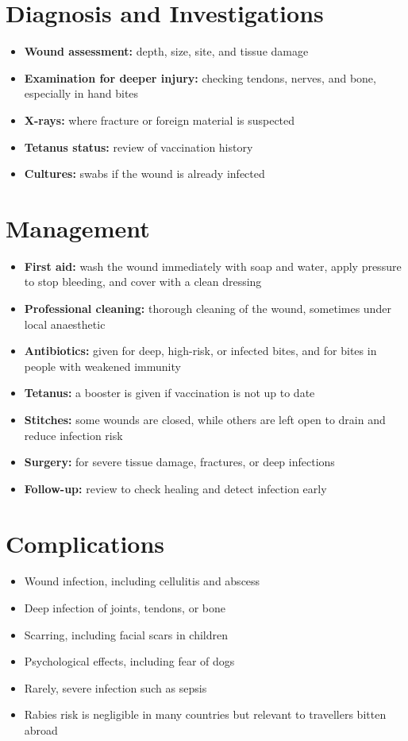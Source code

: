 \section*{Diagnosis and Investigations}
\begin{itemize}
    \item \textbf{Wound assessment:} depth, size, site, and tissue damage
    \item \textbf{Examination for deeper injury:} checking tendons, nerves, and bone, especially in hand bites
    \item \textbf{X-rays:} where fracture or foreign material is suspected
    \item \textbf{Tetanus status:} review of vaccination history
    \item \textbf{Cultures:} swabs if the wound is already infected
\end{itemize}

\section*{Management}
\begin{itemize}
    \item \textbf{First aid:} wash the wound immediately with soap and water, apply pressure to stop bleeding, and cover with a clean dressing
    \item \textbf{Professional cleaning:} thorough cleaning of the wound, sometimes under local anaesthetic
    \item \textbf{Antibiotics:} given for deep, high-risk, or infected bites, and for bites in people with weakened immunity
    \item \textbf{Tetanus:} a booster is given if vaccination is not up to date
    \item \textbf{Stitches:} some wounds are closed, while others are left open to drain and reduce infection risk
    \item \textbf{Surgery:} for severe tissue damage, fractures, or deep infections
    \item \textbf{Follow-up:} review to check healing and detect infection early
\end{itemize}

\section*{Complications}
\begin{itemize}
    \item Wound infection, including cellulitis and abscess
    \item Deep infection of joints, tendons, or bone
    \item Scarring, including facial scars in children
    \item Psychological effects, including fear of dogs
    \item Rarely, severe infection such as sepsis
    \item Rabies risk is negligible in many countries but relevant to travellers bitten abroad
\end{itemize}

